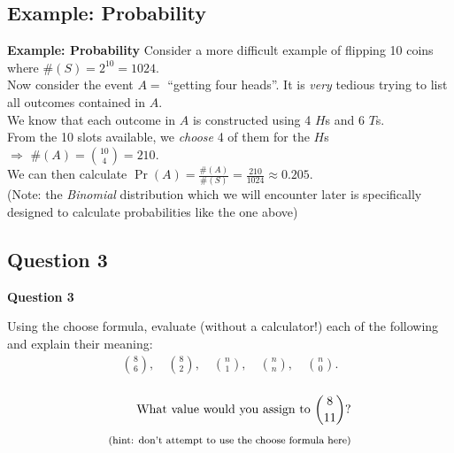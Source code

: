\documentclass[compress]{beamer}        %
\makeatletter
\newcommand{\tcb}{\textcolor{beamer@blendedblue}}
\makeatother
\begin{document}
\subsection{Example: Probability}
\begin{frame}{\bf \tcb{Example: Probability}}
Consider a more difficult example of flipping 10 coins where $\#(S) = 2^{10} = 1024$.\\[0.2cm]
Now consider the event $A =$ ``getting four heads''. It is \emph{very} tedious trying to list all outcomes contained in $A$.\\[0.6cm]

We know that each outcome in $A$ is constructed using 4 $H$s and 6 $T$s.\\[0.2cm]
From the 10 slots available, we \emph{choose} 4 of them for the $H$s\\[0.1cm] $\Rightarrow$ $\#(A) = \binom{10}{4} = 210$.\\[0.4cm]

We can then calculate $\Pr(A) = \frac{\#(A)}{\#(S)} = \frac{210}{1024} \approx 0.205$.\\[0.6cm]

{\footnotesize(Note: the \emph{Binomial} distribution which we will encounter later is specifically designed to calculate probabilities like the one above)}

\end{frame}



\subsection{Question 3}
\begin{frame}{\bf \tcb{Question 3}}

Using the choose formula, evaluate (without a calculator!) each of the following and explain their meaning:\\
\begin{align*}
\binom{8}{6}, \quad \binom{8}{2}, \quad \binom{n}{1}, \quad \binom{n}{n}, \quad \binom{n}{0}.\\
\end{align*}

\begin{align*}
\text{What value would you assign to } \binom{8}{11} \text{?}\\[0.1cm]
\text{{\footnotesize(hint: don't attempt to use the choose formula here)}}
\end{align*}

\end{frame}
\end{document}
